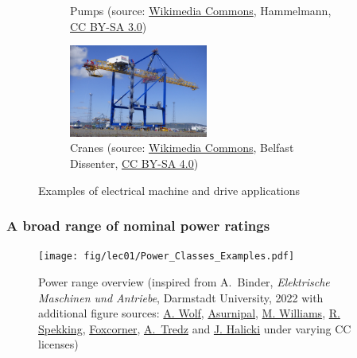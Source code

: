 \begin{frame}
\begin{figure}
\begin{subfigure}[b]{0.49\textwidth}
			\caption{Pumps (source: \href{https://commons.wikimedia.org/wiki/File:Hammelmann_Stationary_unit_with_electric_motor.jpg}{Wikimedia Commons}, Hammelmann, \href{https://creativecommons.org/licenses/by-sa/3.0/deed.en}{CC BY-SA 3.0})}
		\end{subfigure}
		\hfill
		\begin{subfigure}[b]{0.49\textwidth}
			\centering
			\includegraphics[width=0.5\textwidth]{fig/lec01/crane.jpg}
			\caption{Cranes (source: \href{https://commons.wikimedia.org/wiki/File:Hammelmann_Stationary_unit_with_electric_motor.jpg}{Wikimedia Commons}, Belfast Dissenter, \href{https://creativecommons.org/licenses/by-sa/4.0/deed.en}{CC BY-SA 4.0})}
		\end{subfigure}
		\caption*{Examples of electrical machine and drive applications} 
        \label{fig:examples_machine_drives_02}
	\end{figure}
\end{frame}

\begin{frame}
	\frametitle{A broad range of nominal power ratings}
	\vspace{-0.1cm}
	\begin{figure}
		\centering
		\texttt{[image: fig/lec01/Power\_Classes\_Examples.pdf]}
		\caption{Power range overview (inspired  from A.~Binder, \textit{Elektrische Maschinen und Antriebe}, Darmstadt University, 2022 with additional figure sources: \href{https://www.flickr.com/photos/arthurwolf/5393520058/}{A. Wolf}, \href{https://commons.wikimedia.org/wiki/File:Wald_am_Arlberg-OeBB_Spullersee_power_plant-M1-Rotor-11ASD.jpg}{Asurnipal}, \href{https://www.flickr.com/photos/mouser-nerdbot/7042785635}{M. Williams}, \href{https://de.m.wikipedia.org/wiki/Datei:Stick_blender_Electrolux_AEG_HB_9807_-_stator_of_the_electric_motor-4313.jpg}{R. Spekking}, \href{https://commons.wikimedia.org/wiki/File:Electric_motor_and_transmission_in_a_truck.jpg}{Foxcorner}, \href{https://commons.wikimedia.org/wiki/File:E-bike_electric_motor_shimano_ep_8.jpg}{A.~Tredz} and \href{https://commons.wikimedia.org/wiki/File:2023_Corsair_SP120_RGB_Elite.jpg}{J. Halicki} under varying CC licenses) }
		\label{Power_Classes_Examples}
	\end{figure}
\end{frame}

